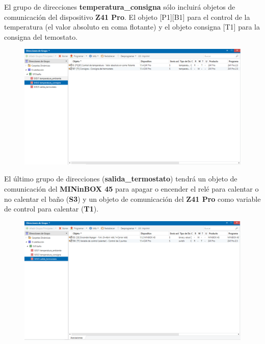 \documentclass[10pt]{article}
\begin{document}
El grupo de direcciones \textbf{temperatura\_consigna} sólo incluirá objetos de comunicación del dispositivo \textbf{Z41 Pro}. El objeto [P1][B1] para el control de la temperatura (el valor absoluto en coma flotante) y el objeto consigna [T1] para la consigna del temostato. \\

\begin{figure}[H]
	\begin{center}
	 		\includegraphics[width = 1.00\textwidth]{Imagenes/img33}
	\end{center} 
\end{figure}

El último grupo de direcciones (\textbf{salida\_termostato}) tendrá un objeto de comunicación del \textbf{MINinBOX 45} para apagar o encender el relé para calentar o no calentar el baño (\textbf{S3}) y un objeto de comunicación del \textbf{Z41 Pro} como variable de control para calentar (\textbf{T1}).\\ 

\begin{figure}[H]
	\begin{center}
	 		\includegraphics[width = 1.00\textwidth]{Imagenes/img34}
	\end{center} 
\end{figure}
\end{document}
